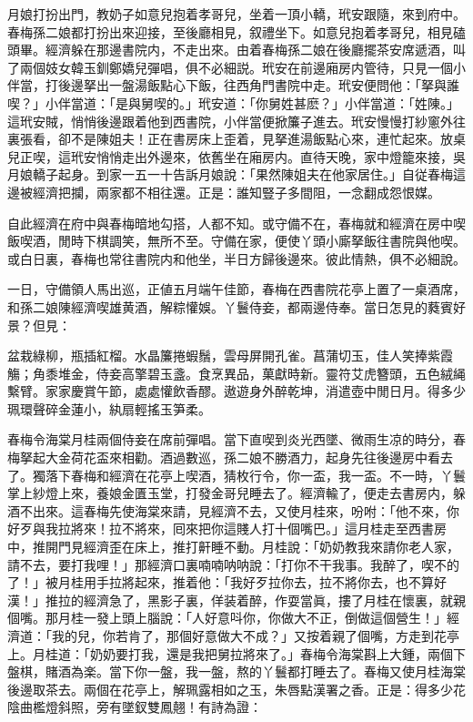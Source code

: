 月娘打扮出門，教奶子如意兒抱着孝哥兒，坐着一頂小轎，玳安跟隨，來到府中。春梅孫二娘都打扮出來迎接，至後廳相見，叙禮坐下。如意兒抱着孝哥兒，相見磕頭畢。經濟躲在那邊書院内，不走出來。由着春梅孫二娘在後廳擺茶安席遞酒，叫了兩個妓女韓玉釧鄭嬌兒彈唱，俱不必細説。玳安在前邊廂房内管待，只見一個小伴當，打後邊拏出一盤湯飯點心下飯，往西角門書院中走。玳安便問他：「拏與誰喫？」小伴當道：「是與舅喫的。」玳安道：「你舅姓甚麽？」小伴當道：「姓陳。」這玳安賊，悄悄後邊跟着他到西書院，小伴當便掀簾子進去。玳安慢慢打紗窻外往裏張看，卻不是陳姐夫！正在書房床上歪着，見拏進湯飯點心來，連忙起來。放桌兒正喫，這玳安悄悄走出外邊來，依舊坐在廂房内。直待天晚，家中燈籠來接，吳月娘轎子起身。到家一五一十告訴月娘說：「果然陳姐夫在他家居住。」自従春梅這邊被經濟把攔，兩家都不相往還。正是：誰知豎子多間阻，一念翻成怨恨媒。

自此經濟在府中與春梅暗地勾搭，人都不知。或守備不在，春梅就和經濟在房中喫飯喫酒，閒時下棋調笑，無所不至。守備在家，便使丫頭小廝拏飯往書院與他喫。或白日裏，春梅也常往書院内和他坐，半日方歸後邊來。彼此情熱，俱不必細說。

一日，守備領人馬出巡，正値五月端午佳節，春梅在西書院花亭上置了一桌酒席，和孫二娘陳經濟喫雄黄酒，解粽懽娛。丫鬟侍妾，都兩邊侍奉。當日怎見的蕤賓好景？但見：

\begin{myquote}
盆栽綠柳，瓶插紅榴。水晶簾捲蝦鬚，雲母屏開孔雀。菖蒲切玉，佳人笑捧紫霞觴；角黍堆金，侍妾高擎碧玉盞。食烹異品，菓獻時新。靈符艾虎簪頭，五色絨䋲繫臂。家家慶賞午節，處處懽飲香醪。遨遊身外醉乾坤，消遣壺中閒日月。得多少珮環聲碎金蓮小，紈扇輕搖玉笋柔。
\end{myquote}

春梅令海棠月桂兩個侍妾在席前彈唱。當下直喫到炎光西墜、微雨生凉的時分，春梅拏起大金荷花盃來相勸。酒過數巡，孫二娘不勝酒力，起身先往後邊房中看去了。獨落下春梅和經濟在花亭上喫酒，猜枚行令，你一盃，我一盃。不一時，丫鬟掌上紗燈上來，養娘金匱玉堂，打發金哥兒睡去了。經濟輸了，便走去書房内，躲酒不出來。這春梅先使海棠來請，見經濟不去，又使月桂來，吩咐：「他不來，你好歹與我拉將來！拉不將來，囘來把你這賤人打十個嘴巴。」這月桂走至西書房中，推開門見經濟歪在床上，推打鼾睡不動。月桂說：「奶奶教我來請你老人家，請不去，要打我哩！」那經濟口裏喃喃呐呐說：「打你不干我事。我醉了，喫不的了！」被月桂用手拉將起來，推着他：「我好歹拉你去，拉不將你去，也不算好漢！」推拉的經濟急了，黑影子裏，佯装着醉，作耍當眞，摟了月桂在懷裏，就親個嘴。那月桂一發上頭上腦說：「人好意呌你，你做大不正，倒做這個營生！」經濟道：「我的兒，你若肯了，那個好意做大不成？」又按着親了個嘴，方走到花亭上。月桂道：「奶奶要打我，還是我把舅拉將來了。」春梅令海棠斟上大鍾，兩個下盤棋，賭酒為楽。當下你一盤，我一盤，熬的丫鬟都打睡去了。春梅又使月桂海棠後邊取茶去。兩個在花亭上，解珮露相如之玉，朱唇點漢署之香。正是：得多少花陰曲檻燈斜照，旁有墜釵雙鳳翹！有詩為證：

